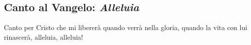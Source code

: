 
\subsection*{Canto al Vangelo: \textit{Alleluia}}

		\begin{mystrofe}
		\end{mystrofe}

		\begin{mystrofe}
			Canto per Cristo che mi libererà quando verrà nella gloria, quando la vita con lui rinascerà, alleluia, alleluia!
		\end{mystrofe}

		\begin{mystrofe}
			\ritornello{}
		\end{mystrofe}

